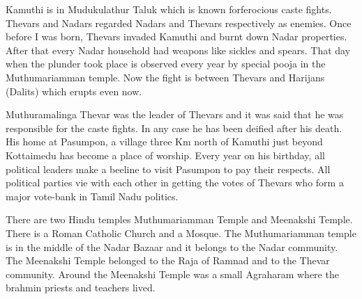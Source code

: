 Kamuthi is in Mudukulathur Taluk which is known for\break ferocious caste 
fights. Thevars and Nadars regarded Nadars and Thevars respectively as 
enemies. Once before I was born, Thevars invaded Kamuthi and burnt down 
Nadar properties. After that every Nadar household had weapons like 
sickles and spears. That day when the plunder took place is observed 
every year by special pooja in the Muthumariamman temple. Now the fight 
is between Thevars and Harijans (Dalits) which erupts even now.

Muthuramalinga Thevar was the leader of Thevars and it was said that he 
was responsible for the caste fights. In any case he has been deified 
after his death. His home at Pasumpon, a village three Km north of 
Kamuthi just beyond Kottaimedu has become a place of worship. Every year 
on his birthday, all political leaders make a beeline to visit Pasumpon 
to pay their respects. All political parties vie with each other in 
getting the votes of Thevars who form a major vote-bank in Tamil Nadu 
politics.
 
There are two Hindu temples Muthumariamman Temple and Meenakshi Temple. 
There is a Roman Catholic Church and a Mosque. The Muthumariamman temple 
is in the middle of the Nadar Bazaar and it belongs to the Nadar 
community. The Meenakshi Temple belonged to the Raja of Ramnad and to 
the Thevar community. Around the Meenakshi Temple was a small Agraharam 
where the brahmin priests and teachers lived.
\bigskip

